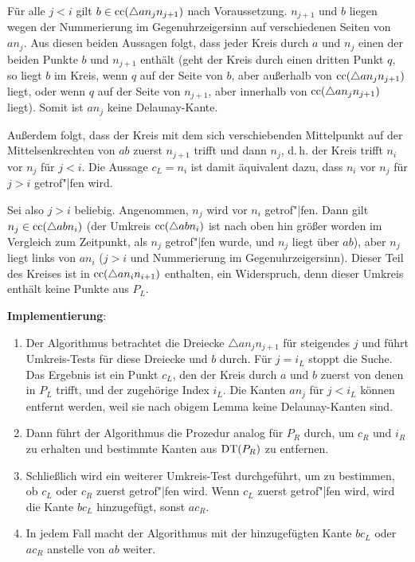 \begin{Beweis}
    Für alle $j < i$ gilt $b \in \operatorname{cc}(\triangle a n_j n_{j+1})$ nach Voraussetzung.
    $n_{j+1}$ und $b$ liegen wegen der Nummerierung im Gegenuhrzeigersinn auf verschiedenen Seiten
    von $an_j$.
    Aus diesen beiden Aussagen folgt, dass jeder Kreis durch $a$ und $n_j$
    einen der beiden Punkte $b$ und $n_{j+1}$ enthält
    (geht der Kreis durch einen dritten Punkt $q$,
    so liegt $b$ im Kreis, wenn $q$ auf der Seite von $b$, aber außerhalb von
    $\operatorname{cc}(\triangle a n_j n_{j+1})$ liegt,
    oder wenn $q$ auf der Seite von $n_{j+1}$, aber innerhalb von $\operatorname{cc}(\triangle a n_j n_{j+1})$
    liegt).
    Somit ist $an_j$ keine Delaunay-Kante.
    
    Außerdem folgt, dass der Kreis mit dem sich verschiebenden Mittelpunkt auf der
    Mittelsenkrechten von $ab$ zuerst $n_{j+1}$ trifft und dann $n_j$,
    d.\,h. der Kreis trifft $n_i$ vor $n_j$ für $j < i$.
    Die Aussage $c_L = n_i$ ist damit äquivalent dazu, dass $n_i$ vor $n_j$ für $j > i$
    getrof"|fen wird.
    
    Sei also $j > i$ beliebig.
    Angenommen, $n_j$ wird vor $n_i$ getrof"|fen.
    Dann gilt $n_j \in \operatorname{cc}(\triangle abn_i)$
    (der Umkreis $\operatorname{cc}(\triangle abn_i)$ ist nach oben hin größer worden im Vergleich zum
    Zeitpunkt, als $n_j$ getrof"|fen wurde, und $n_j$ liegt über $ab$),
    aber $n_j$ liegt links von $an_i$
    ($j > i$ und Nummerierung im Gegenuhrzeigersinn).
    Dieser Teil des Kreises ist in $\operatorname{cc}(\triangle an_i n_{i+1})$ enthalten,
    ein Widerspruch, denn dieser Umkreis enthält keine Punkte aus $P_L$.
\end{Beweis}

\linie

\textbf{Implementierung}:
\begin{enumerate}
    \item
    Der Algorithmus betrachtet die Dreiecke $\triangle a n_j n_{j+1}$ für steigendes $j$ und
    führt Umkreis-Tests für diese Dreiecke und $b$ durch.
    Für $j = i_L$ stoppt die Suche.
    Das Ergebnis ist ein Punkt $c_L$, den der Kreis durch $a$ und $b$ zuerst von denen in $P_L$
    trifft, und der zugehörige Index $i_L$.
    Die Kanten $an_j$ für $j < i_L$ können entfernt werden, weil sie nach obigem Lemma keine
    Delaunay-Kanten sind.
    
    \item
    Dann führt der Algorithmus die Prozedur analog für $P_R$ durch, um $c_R$ und $i_R$ zu
    erhalten und bestimmte Kanten aus $\operatorname{DT}(P_R)$ zu entfernen.
    
    \item
    Schließlich wird ein weiterer Umkreis-Test durchgeführt, um zu bestimmen, ob $c_L$ oder $c_R$
    zuerst getrof"|fen wird.
    Wenn $c_L$ zuerst getrof"|fen wird, wird die Kante $bc_L$ hinzugefügt,
    sonst $ac_R$.
    
    \item
    In jedem Fall macht der Algorithmus mit der hinzugefügten Kante $bc_L$ oder $ac_R$ 
    anstelle von $ab$ weiter.
\end{enumerate}

